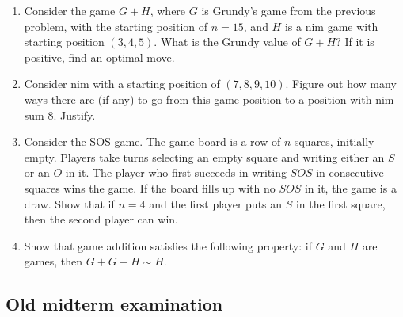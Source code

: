 \documentclass{amsart}
\begin{document}
\begin{enumerate}
\item Consider the game \(G + H\), where \(G\) is Grundy's game from the previous problem, with the starting position of \(n = 15\), and \(H\) is a nim game with starting position \((3,4,5)\).
What is the Grundy value of \(G + H\)? If it is positive, find an optimal move.
\item Consider nim with a starting position of \((7, 8, 9, 10)\). Figure out how many ways there are (if any) to go from this game position to a position with nim sum \(8\). Justify.
\item Consider the SOS game. The game board is a row of \(n\) squares, initially empty. Players take turns selecting an empty square and writing either an \(S\) or an \(O\) in it. The player who first succeeds in writing \(SOS\) in consecutive squares wins the game. If the board fills up with no \(SOS\) in it, the game is a draw. Show that if \(n = 4\) and the first player puts an \(S\) in the first square, then the second player can win.
\item Show that game addition satisfies the following property: if \(G\) and \(H\) are games, then \(G + G + H \sim H\).
\end{enumerate}
\subsection{Old midterm examination}
\label{sec:orgab6ac62}
\end{document}
